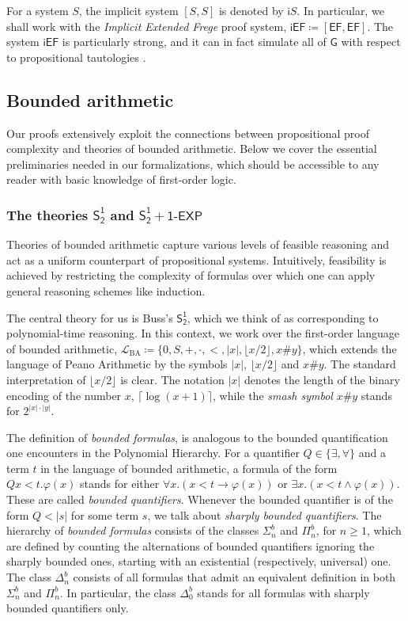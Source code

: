 \documentclass[11pt]{article}
\newcommand{\SOT}{\mathsf{S^1_2}}
\newcommand{\SOTEXP}{\mathsf{S^1_2} + \mathsf{1\textsf{-}EXP}}
\newcommand{\EF}{\mathsf{EF}}
\newcommand{\iEF}{\mathsf{iEF}}
\newcommand{\imp}{\mathsf{i}}
\theoremstyle{definition}
\theoremstyle{plain}
\theoremstyle{remark}
\begin{document}
For a system $S$, the implicit system $[S, S]$ is denoted by $\imp S$. In particular, we shall work with the \emph{Implicit Extended Frege} proof system, $\iEF \coloneqq [\EF, \EF]$. The system $\iEF$ is particularly strong, and it can in fact simulate all of $\mathsf{G}$ with respect to propositional tautologies \cite[Cor. 2.4]{Kra04}.

\subsection{Bounded arithmetic}

Our proofs extensively exploit the connections between propositional proof complexity and theories of bounded arithmetic. Below we cover the essential preliminaries needed in our formalizations, which should be accessible to any reader with basic knowledge of first-order logic. 

\subsubsection{The theories $\SOT$ and $\SOTEXP$}
Theories of bounded arithmetic capture various levels of feasible reasoning and act as a uniform counterpart of propositional systems. Intuitively, feasibility is achieved by restricting the complexity of formulas over which one can apply general reasoning schemes like induction.

The central theory for us is Buss's $\SOT$, which we think of as corresponding to polynomial-time reasoning. In this context, we work over the first-order language of bounded arithmetic, $\mathcal{L}_{\text{BA}} \coloneqq \{ 0, S, +, \cdot, <, |x|, \lfloor x/2 \rfloor, x \# y\}$, which extends the language of Peano Arithmetic by the symbols $|x|$, $\lfloor x/2 \rfloor$ and $x \# y$. The standard interpretation of $\lfloor x/2 \rfloor$ is clear. The notation $|x|$ denotes the length of the binary encoding of the number $x$, $\lceil \log (x + 1) \rceil$, while the \emph{smash symbol} $x\#y$ stands for $2^{|x|\cdot|y|}$.

The definition of \emph{bounded formulas}, is analogous to the bounded quantification one encounters in the Polynomial Hierarchy. For a quantifier $Q \in \{ \exists, \forall\}$ and a term $t$ in the language of bounded arithmetic, a formula of the form $Qx< t. \varphi(x)$ stands for either $\forall x. (x < t \to \varphi(x))$ or $\exists x. (x < t \land \varphi(x))$. These are called \emph{bounded quantifiers}. Whenever the bounded quantifier is of the form $Q < |s|$ for some term $s$, we talk about \emph{sharply bounded quantifiers}. The hierarchy of \emph{bounded formulas} consists of the classes $\Sigma_n^b$ and $\Pi_n^b$, for $n \geq 1$, which are defined by counting the alternations of bounded quantifiers ignoring the sharply bounded ones, starting with an existential (respectively, universal) one. The class $\Delta_n^b$ consists of all formulas that admit an equivalent definition in both $\Sigma_n^b$ and $\Pi_n^b$. In particular, the class $\Delta_0^b$ stands for all formulas with sharply bounded quantifiers only.
\end{document}
